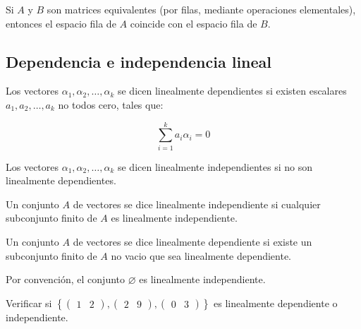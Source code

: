 		\begin{definicion}
			Si $A$ y $B$ son matrices equivalentes (por filas, mediante operaciones elementales), entonces el espacio fila de $A$ coincide con el espacio fila de $B$.
		\end{definicion}
 
	\newpage
	\subsection{Dependencia e independencia lineal}

		\begin{definicion}
			Los vectores $\alpha_1, \alpha_2, \dots, \alpha_k$ se dicen linealmente dependientes si existen escalares $a_1, a_2, \dots, a_k$ no todos cero, tales que:

			\begin{equation}
				\sum_{i=1}^k a_i \alpha_i = 0
			\end{equation}

			Los vectores $\alpha_1, \alpha_2, \dots, \alpha_k$ se dicen linealmente independientes si no son linealmente dependientes.
		\end{definicion}

		\begin{definicion}
			Un conjunto $A$ de vectores se dice linealmente independiente si cualquier subconjunto finito de $A$ es linealmente independiente.
		\end{definicion}

		\begin{definicion}
			Un conjunto $A$ de vectores se dice linealmente dependiente si existe un subconjunto finito de $A$ no vacio que sea linealmente dependiente.
		\end{definicion}

		\begin{observacion}
			Por convención, el conjunto $\varnothing$ es linealmente independiente.
		\end{observacion}

		\begin{ejemplo}
			Verificar si $\left\{ \begin{pmatrix} 1 & 2 \end{pmatrix}, \begin{pmatrix} 2 & 9 \end{pmatrix}, \begin{pmatrix} 0 & 3 \end{pmatrix} \right\}$ es linealmente dependiente o independiente.
		\end{ejemplo}

